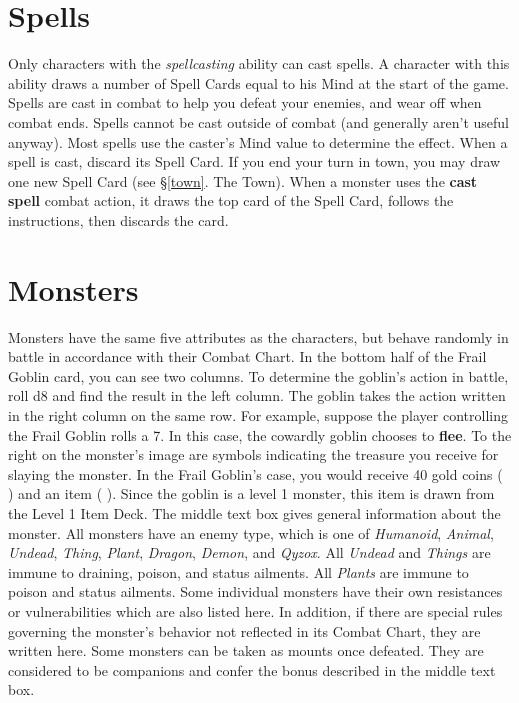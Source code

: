 \documentclass{book}
\begin{document}
\section{Spells} \label{spellcasting}
Only characters with the \emph{spellcasting} ability can cast spells. A character with this ability draws a number of Spell Cards equal to his Mind at the start of the game. Spells are cast in combat to help you defeat your enemies, and wear off when combat ends. Spells cannot be cast outside of combat (and generally aren’t useful anyway).
Most spells use the caster’s Mind value to determine the effect. When a spell is cast, discard its Spell Card. If you end your turn in town, you may draw one new Spell Card (see §\ref{town}. The Town).
When a monster uses the \textbf{cast spell} combat action, it draws the top card of the Spell Card, follows the instructions, then discards the card.

\section{Monsters} \label{monsters}

Monsters have the same five attributes as the characters, but behave randomly in battle in accordance with their Combat Chart. In the bottom half of the Frail Goblin card, you can see two columns. To determine the goblin’s action in battle, roll d8 and find the result in the left column. The goblin takes the action written in the right column on the same row. For example, suppose the player controlling the Frail Goblin rolls a 7. In this case, the cowardly goblin chooses to \textbf{flee}.
To the right on the monster’s image are symbols indicating the treasure you receive for slaying the monster. In the Frail Goblin’s case, you would receive 40 gold coins ( ) and an item ( ). Since the goblin is a level 1 monster, this item is drawn from the Level 1 Item Deck.
The middle text box gives general information about the monster. All monsters have an enemy type, which is one of \emph{Humanoid}, \emph{Animal}, \emph{Undead}, \emph{Thing}, \emph{Plant}, \emph{Dragon}, \emph{Demon}, and \emph{Qyzox}. All \emph{Undead} and \emph{Things} are immune to draining, poison, and status ailments. All \emph{Plants} are immune to poison and status ailments. Some individual monsters have their own resistances or vulnerabilities which are also listed here. In addition, if there are special rules governing the monster’s behavior not reflected in its Combat Chart, they are written here.
Some monsters can be taken as mounts once defeated. They are considered to be companions and confer the bonus described in the middle text box.
\end{document}
